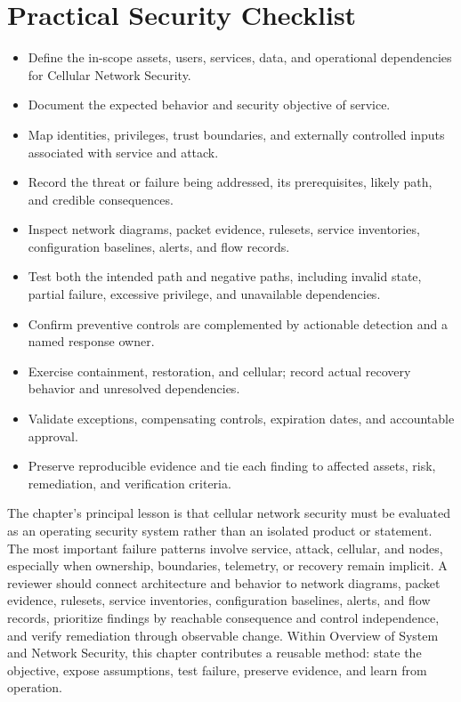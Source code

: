 \documentclass[11pt]{article}
\begin{document}
\section*{Practical Security Checklist}
\begin{itemize}[label=$\square$]
\item Define the in-scope assets, users, services, data, and operational dependencies for Cellular Network Security.
\item Document the expected behavior and security objective of service.
\item Map identities, privileges, trust boundaries, and externally controlled inputs associated with service and attack.
\item Record the threat or failure being addressed, its prerequisites, likely path, and credible consequences.
\item Inspect network diagrams, packet evidence, rulesets, service inventories, configuration baselines, alerts, and flow records.
\item Test both the intended path and negative paths, including invalid state, partial failure, excessive privilege, and unavailable dependencies.
\item Confirm preventive controls are complemented by actionable detection and a named response owner.
\item Exercise containment, restoration, and cellular; record actual recovery behavior and unresolved dependencies.
\item Validate exceptions, compensating controls, expiration dates, and accountable approval.
\item Preserve reproducible evidence and tie each finding to affected assets, risk, remediation, and verification criteria.
\end{itemize}
\begin{synthesisbox}
The chapter's principal lesson is that cellular network security must be evaluated as an operating security system rather than an isolated product or statement. The most important failure patterns involve service, attack, cellular, and nodes, especially when ownership, boundaries, telemetry, or recovery remain implicit. A reviewer should connect architecture and behavior to network diagrams, packet evidence, rulesets, service inventories, configuration baselines, alerts, and flow records, prioritize findings by reachable consequence and control independence, and verify remediation through observable change. Within Overview of System and Network Security, this chapter contributes a reusable method: state the objective, expose assumptions, test failure, preserve evidence, and learn from operation.
\end{synthesisbox}
\end{document}
